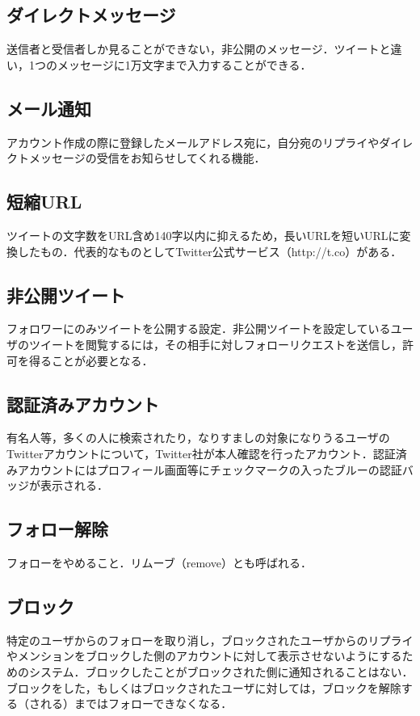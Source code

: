 \subsection{ダイレクトメッセージ}
送信者と受信者しか見ることができない，非公開のメッセージ．ツイートと違い，1つのメッセージに1万文字まで入力することができる．

\subsection{メール通知}
アカウント作成の際に登録したメールアドレス宛に，自分宛のリプライやダイレクトメッセージの受信をお知らせしてくれる機能．

\subsection{短縮URL}
ツイートの文字数をURL含め140字以内に抑えるため，長いURLを短いURLに変換したもの．代表的なものとしてTwitter公式サービス（http://t.co）がある．

\subsection{非公開ツイート}
フォロワーにのみツイートを公開する設定．非公開ツイートを設定しているユーザのツイートを閲覧するには，その相手に対しフォローリクエストを送信し，許可を得ることが必要となる．

\subsection{認証済みアカウント}
有名人等，多くの人に検索されたり，なりすましの対象になりうるユーザのTwitterアカウントについて，Twitter社が本人確認を行ったアカウント．認証済みアカウントにはプロフィール画面等にチェックマークの入ったブルーの認証バッジが表示される．

\subsection{フォロー解除}
フォローをやめること．リムーブ（remove）とも呼ばれる．

\subsection{ブロック}
特定のユーザからのフォローを取り消し，ブロックされたユーザからのリプライやメンションをブロックした側のアカウントに対して表示させないようにするためのシステム．ブロックしたことがブロックされた側に通知されることはない．ブロックをした，もしくはブロックされたユーザに対しては，ブロックを解除する（される）まではフォローできなくなる．

